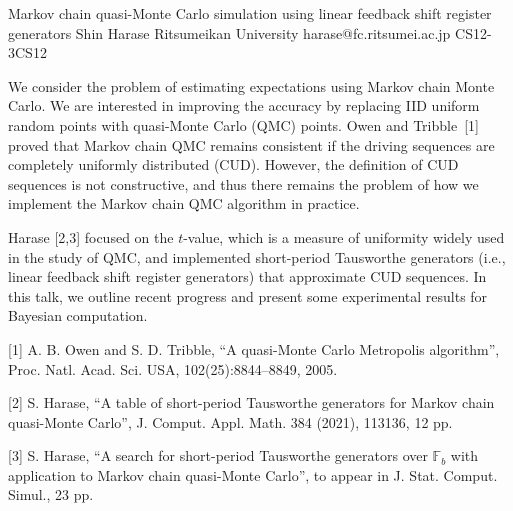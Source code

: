 \begin{talk}
  {Markov chain quasi-Monte Carlo simulation using linear feedback shift register generators}%
  {Shin Harase}%
  {Ritsumeikan University}%
  {harase@fc.ritsumei.ac.jp}%
  {}%
{}{}{CS12-3}{CS12}

				
We consider the problem of estimating expectations using Markov chain Monte Carlo.
We are interested in improving the accuracy by replacing IID uniform random points with quasi-Monte Carlo (QMC) points. 
Owen and Tribble~[1] proved that 
Markov chain QMC remains consistent if the driving sequences are completely uniformly distributed (CUD). 
However, the definition of CUD sequences is not constructive, and 
thus there remains the problem of how we implement the Markov chain QMC algorithm in practice. 

Harase [2,3] focused on the $t$-value, which is a measure of 
uniformity widely used in the study of QMC, and implemented 
short-period Tausworthe generators (i.e., linear feedback shift register generators) 
that approximate CUD sequences. 
In this talk, we outline recent progress and 
present some experimental results for Bayesian computation. 

\medskip

%
%
[1] A. B. Owen and S. D. Tribble, ``A quasi-{M}onte {C}arlo {M}etropolis algorithm'',  Proc. Natl. Acad. Sci. USA, 102(25):8844–8849, 2005.

%
[2] S. Harase, ``A table of short-period {T}ausworthe generators for {M}arkov chain quasi-{M}onte {C}arlo'',  {J}. {C}omput. {A}ppl. {M}ath. 384 (2021), 113136, 12 pp.

%
[3] S. Harase, ``A search for short-period Tausworthe generators over $\mathbb{F}_b$ with application to Markov chain quasi-Monte Carlo'', to appear in J. Stat. Comput. Simul., 23 pp.
\end{talk}

